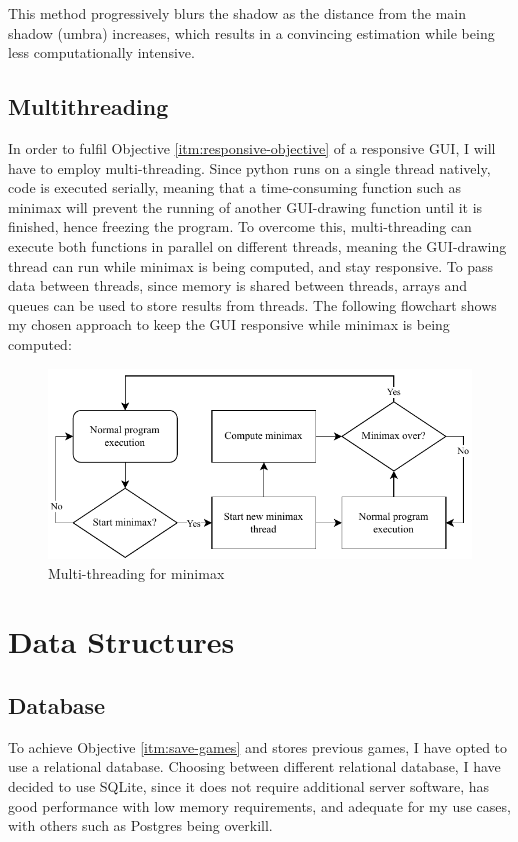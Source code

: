 \documentclass[../main/main.tex]{subfiles}
\begin{document}
This method progressively blurs the shadow as the distance from the main shadow (umbra) increases, which results in a convincing estimation while being less computationally intensive.

\subsection{Multithreading}
\label{sec:design-multithreading}
In order to fulfil Objective \ref{itm:responsive-objective} of a responsive GUI, I will have to employ multi-threading. Since python runs on a single thread natively, code is executed serially, meaning that a time-consuming function such as minimax will prevent the running of another GUI-drawing function until it is finished, hence freezing the program. To overcome this, multi-threading can execute both functions in parallel on different threads, meaning the GUI-drawing thread can run while minimax is being computed, and stay responsive. To pass data between threads, since memory is shared between threads, arrays and queues can be used to store results from threads. The following flowchart shows my chosen approach to keep the GUI responsive while minimax is being computed:

\begin{figure}[H]
    \centering
    \includegraphics[width=\columnwidth]{../design/assets/multi_threading.pdf}
    \caption{Multi-threading for minimax}
    \label{fig:multi-threading}
\end{figure}

\section{Data Structures}
\subsection{Database}
To achieve Objective \ref{itm:save-games} and stores previous games, I have opted to use a relational database. Choosing between different relational database, I have decided to use SQLite, since it does not require additional server software, has good performance with low memory requirements, and adequate for my use cases, with others such as Postgres being overkill.
\end{document}
